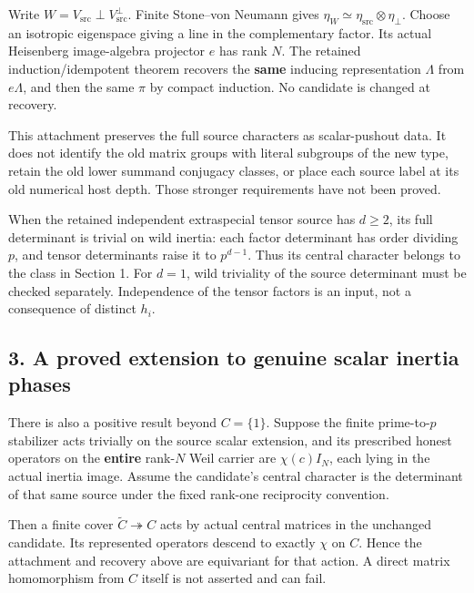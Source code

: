 Write \(W=V_{\mathrm{src}}\perp V_{\mathrm{src}}^\perp\). Finite
Stone--von Neumann gives
\(\eta_W\simeq\eta_{\mathrm{src}}\otimes\eta_\perp\). Choose an
isotropic eigenspace giving a line in the complementary factor. Its
actual Heisenberg image-algebra projector \(e\) has rank \(N\). The
retained induction/idempotent theorem recovers the \textbf{same}
inducing representation \(\Lambda\) from \(e\Lambda\), and then the same
\(\pi\) by compact induction. No candidate is changed at recovery.

This attachment preserves the full source characters as scalar-pushout
data. It does not identify the old matrix groups with literal subgroups
of the new type, retain the old lower summand conjugacy classes, or
place each source label at its old numerical host depth. Those stronger
requirements have not been proved.

When the retained independent extraspecial tensor source has \(d\ge2\),
its full determinant is trivial on wild inertia: each factor determinant
has order dividing \(p\), and tensor determinants raise it to
\(p^{d-1}\). Thus its central character belongs to the class in Section
1. For \(d=1\), wild triviality of the source determinant must be
checked separately. Independence of the tensor factors is an input, not
a consequence of distinct \(h_i\).

\hypertarget{odd_synthesis-a-proved-extension-to-genuine-scalar-inertia-phases}{%
\subsection{3. A proved extension to genuine scalar inertia
phases}\label{odd_synthesis-a-proved-extension-to-genuine-scalar-inertia-phases}}

There is also a positive result beyond \(C=\{1\}\). Suppose the finite
prime-to-\(p\) stabilizer acts trivially on the source scalar extension,
and its prescribed honest operators on the \textbf{entire} rank-\(N\)
Weil carrier are \(\chi(c)I_N\), each lying in the actual inertia image.
Assume the candidate's central character is the determinant of that same
source under the fixed rank-one reciprocity convention.

Then a finite cover \(\widetilde C\twoheadrightarrow C\) acts by actual
central matrices in the unchanged candidate. Its represented operators
descend to exactly \(\chi\) on \(C\). Hence the attachment and recovery
above are equivariant for that action. A direct matrix homomorphism from
\(C\) itself is not asserted and can fail.

